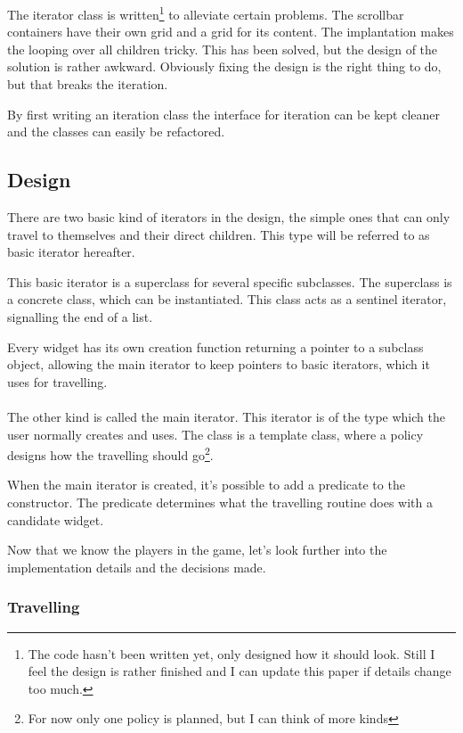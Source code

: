 The iterator class is written\footnote{The code hasn't been written yet, only
designed how it should look. Still I feel the design is rather finished and I
can update this paper if details change too much.} to alleviate certain
problems. The scrollbar containers have their own grid and a grid for its
content. The implantation makes the looping over all children tricky. This has
been solved, but the design of the solution is rather awkward. Obviously fixing
the design is the right thing to do, but that breaks the iteration.

By first writing an iteration class the interface for iteration can be kept
cleaner and the classes can easily be refactored.

\subsection{Design}

There are two basic kind of iterators in the design, the simple ones that can
only travel to themselves and their direct children. This type will be referred to
as basic iterator hereafter. 

This basic iterator is a superclass for several specific subclasses. The
superclass is a concrete class, which can be instantiated. This class acts as a
sentinel iterator, signalling the end of a list.

Every widget has its own creation function returning a pointer to a subclass
object, allowing the main iterator to keep pointers to basic iterators, which it
uses for travelling.

\paragraph{}

The other kind is called the main iterator. This iterator is of the type which the user
normally creates and uses. The class is a template class, where a policy designs
how the travelling should go\footnote{For now only one policy is planned, but I
can think of more kinds}.

When the main iterator is created, it's possible to add a predicate to the
constructor. The predicate determines what the travelling routine does with a
candidate widget.

Now that we know the players in the game, let's look further into the implementation
details and the decisions made.

\subsubsection{Travelling}

